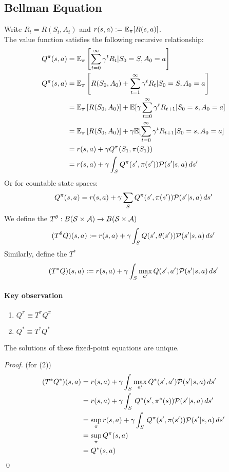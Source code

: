 \documentclass[11pt]{article}
\begin{document}
\subsection{Bellman Equation}
Write $R_t = R(S_t, A_t)$ and $r(s,a) := \mathbb{E}_\pi[R(s,a)]$.\\
The value function satisfies the following recursive relationship:
\begin{align}
	Q^\pi(s, a) &= \mathbb{E}_\pi\left[ \sum_{t=0}^\infty \gamma^tR_t|S_0 = S, A_0 = a\right] \\
	Q^\pi(s, a) &= \mathbb{E}_\pi\left[R(S_0, A_0) + \sum_{t=1}^\infty \gamma^tR_t|S_0 = S, A_0 = a\right] \\
	&= \mathbb{E}_\pi\left[ R(S_0, A_0) \right] + \mathbb{E}[{\gamma\sum_{t=0}^\infty\gamma^tR_{t+1}|S_0=s, A_0=a}]\\
	&= \mathbb{E}_\pi\left[ R(S_0, A_0) \right] + \gamma\mathbb{E}[{\sum_{t=0}^\infty\gamma^tR_{t+1}|S_0=s, A_0=a}]\\
	&= r(s,a) + \gamma  Q^\pi(S_1, \pi(S_1)) \\
	&= r(s,a) + \gamma \int_S Q^\pi(s', \pi(s'))\mathcal{P}(s'|s,a)\,ds'
\end{align}
Or for countable state spaces:
$$Q^\pi(s, a) = r(s,a) + \gamma \sum_S Q^\pi(s', \pi(s'))\mathcal{P}(s'|s,a)\,ds'$$
We define the  $T^\theta: B(\mathcal{S} \times \mathcal{A}) \rightarrow B(\mathcal{S} \times \mathcal{A})$
$$(T^\theta Q)(s,a) := r(s,a) + \gamma \int_S Q(s', \theta(s'))\mathcal{P}(s'|s,a)\,ds'$$
Similarly, define the  $T^*$
$$(T^* Q)(s,a) := r(s,a) + \gamma \int_S\underset{a'}{\max}\,Q(s', a')\mathcal{P}(s'|s,a)\,ds'$$

\paragraph{Key observation}
\begin{enumerate}
	\item $ Q^\pi \equiv T^\pi Q^\pi$ 
	\item $Q^* \equiv T^*Q^*$
\end{enumerate}
The solutions of these fixed-point equations are unique.
\begin{proof} (for (2))
\begin{align}
	(T^* Q^*)(s,a) &= r(s,a) + \gamma \int_S\underset{a'}{\max}\,Q^*(s', a')\mathcal{P}(s'|s,a)\,ds' \\
	&= r(s,a) + \gamma \int_S\,Q^*(s', \pi^*(s))\mathcal{P}(s'|s,a)\,ds' \\
	&= \underset{\pi}{\sup} \, r(s,a) + \gamma \int_S\,Q^\pi(s', \pi(s'))\mathcal{P}(s'|s,a)\,ds' \\
	&= \underset{\pi}{\sup} \, Q^\pi (s,a) \\
	&= Q^*(s,a)
\end{align} \qed
\end{proof}
\end{document}
